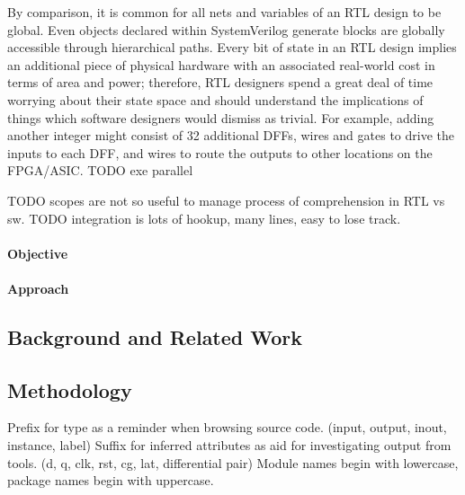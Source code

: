 \documentclass[a4paper]{article}
\begin{document}
By comparison, it is common for all nets and variables of an \gls{RTL} design
to be global.
Even objects declared within SystemVerilog generate blocks are globally
accessible through hierarchical paths.
Every bit of state in an \gls{RTL} design implies an additional piece of
physical hardware with an associated real-world cost in terms of area and
power;
therefore, \gls{RTL} designers spend a great deal of time worrying about their
state space and should understand the implications of things which software
designers would dismiss as trivial.
For example, adding another integer might consist of 32 additional \glspl{DFF},
wires and gates to drive the inputs to each \gls{DFF}, and wires to route the
outputs to other locations on the \gls{FPGA}/\gls{ASIC}.
TODO exe parallel

TODO scopes are not so useful to manage process of comprehension in RTL vs sw.
TODO integration is lots of hookup, many lines, easy to lose track.


\paragraph{Objective} %
\label{sec:HungarianNotation_objective}


\paragraph{Approach} %
\label{sec:HungarianNotation_approach}


\subsection{Background and Related Work} %
\label{sec:HungarianNotation_background}


\subsection{Methodology} %
\label{sec:HungarianNotation_methodology}
Prefix for type as a reminder when browsing source code. (input, output, inout, instance, label)
Suffix for inferred attributes as aid for investigating output from tools. (d,
q, clk, rst, cg, lat, differential pair)
Module names begin with lowercase, package names begin with uppercase.
\end{document}
